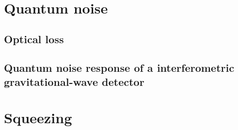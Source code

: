 \section{Quantum noise}
\label{sec:qnoise}






\subsection{Optical loss}



\subsection{Quantum noise response of a interferometric gravitational-wave detector}



\section{Squeezing}



